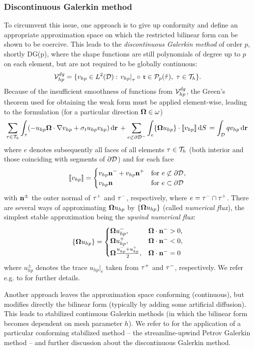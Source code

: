 \subsubsection{Discontinuous Galerkin method}\label{sec:DGM}
To circumvent this issue, one approach is to give up conformity and define an appropriate approximation space on which
the restricted bilinear form can be shown to be coercive. This leads to the \textit{discontinuous Galerkin method}
of order $p$, shortly DG(p), where the shape functions are still polynomials of degree up to $p$ on each element, but
are not required to be globally continuous:
$$
\Space_{hp}^{dg} = \{v_{hp} \in \Lp[2](\VV): \left. v_{hp}\right\vert_{\elem} \circ\, \mathfrak{r} \in
	\mathcal{P}_p(\hat{\elem}),\ \elem\in\mesh
	\}.
$$
Because of the insufficient smoothness of functions from $\Space_{hp}^{dg}$, the Green's theorem used for obtaining the
weak form must be applied element-wise, leading to the formulation (for a particular direction $\bomega\in\omega$)
$$
	\sum_{\elem\in\mesh}\int_{\elem} (-u_{hp}\bomega\cdot\nabla v_{hp} + 
	\sigma_t u_{hp} v_{hp})\,\d{\br} + \sum_{e\not\subset\pV[-]}\int_{e} \{\bomega u_{hp}\}\cdot \jump{v_{hp}}\,
	\d{S} = \int_{\VV} q v_{hp}\,\d{\br} 
$$
where $e$ denotes subsequently all faces of all elements $\elem\in\mesh$ (both interior and those coinciding with
segments of $\pV$) and for each face
$$
	\jump{v_{hp}} = \pw{v_{hp}\bn^- + v_{hp}\bn^+}{for $e\not\subset\pV$}{v_{hp}\bn}{for $e\subset\pV$}
$$
with $\bn^{\pm}$ the outer normal of $\elem^+$ and $\elem^-$, respectively, where $e = \elem^- \cap \elem^+$.
There are several ways of approximating $\bomega u_{hp}$ by $\{\bomega u_{hp}\}$ (called \textit{numerical flux}), the
simplest stable approximation being the \textit{upwind numerical flux}:
$$
	\{\bomega u_{hp}\} = 
	\begin{cases}
		\bomega u_{hp}^-, & \bomega\cdot\bn^- > 0,\\
		\bomega u_{hp}^+, & \bomega\cdot\bn^- < 0,\\
		\bomega \frac{u_{hp}^- + u_{hp}^+}{2}, & \bomega\cdot\bn^- = 0
	\end{cases}
$$
where $u_{hp}^{\pm}$ denotes the trace $u_{hp}\vert_e$ taken from $\elem^+$ and $\elem^-$, respectively. We refer e.g.
to \cite{hartmann} for further details.

Another approach leaves the approximation space conforming (continuous), but modifies directly the bilinear form
(typically by adding some artificial diffusion). This leads to stabilized continuous Galerkin methods (in which
the bilinear form becomes dependent on mesh parameter $h$). We refer to \cite{kanschat} for the application of a
particular conforming stabilized method -- the streamline-upwind Petrov Galerkin method -- and further discussion about
the discontinuous Galerkin method.

